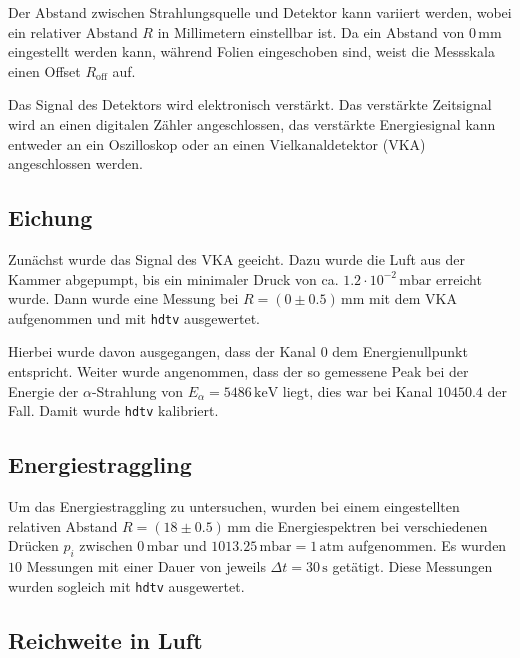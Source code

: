 \documentclass[12pt,a4paper]{scrartcl}
\numberwithin{equation}{section} %
\begin{document}
Der Abstand zwischen Strahlungsquelle und Detektor kann variiert werden, wobei ein relativer Abstand $R$ in Millimetern einstellbar ist. Da ein Abstand von $0\mathrm{\,mm}$ eingestellt werden kann, während Folien eingeschoben sind, weist die Messskala einen Offset $R_\mathrm{off}$ auf.

Das Signal des Detektors wird elektronisch verstärkt. Das verstärkte Zeitsignal wird an einen digitalen Zähler angeschlossen, das verstärkte Energiesignal kann entweder an ein Oszilloskop oder an einen Vielkanaldetektor (VKA) angeschlossen werden.

\hypertarget{eichung}{%
\subsection{Eichung}\label{eichung}}

Zunächst wurde das Signal des VKA geeicht. Dazu wurde die Luft aus der Kammer abgepumpt, bis ein minimaler Druck von ca. $1.2\cdot10^{-2}\mathrm{\,mbar}$ erreicht wurde. Dann wurde eine Messung bei $R=(0\pm0.5)\mathrm{\,mm}$ mit dem VKA aufgenommen und mit \texttt{hdtv} \cite{hdtv} ausgewertet.

Hierbei wurde davon ausgegangen, dass der Kanal $0$ dem Energienullpunkt entspricht. Weiter wurde angenommen, dass der so gemessene Peak bei der Energie der $\alpha$-Strahlung von $E_\alpha = 5486\mathrm{\,keV}$ liegt, dies war bei Kanal $10450.4$ der Fall. Damit wurde \texttt{hdtv} kalibriert.

\hypertarget{energiestraggling}{%
\subsection{Energiestraggling}\label{energiestraggling}}

Um das Energiestraggling zu untersuchen, wurden bei einem eingestellten relativen Abstand $R=(18\pm 0.5)\mathrm{\,mm}$ die Energiespektren bei verschiedenen Drücken $p_i$ zwischen $0\mathrm{\,mbar}$ und $1013.25\mathrm{\,mbar}=1\mathrm{\,atm}$ aufgenommen. Es wurden $10$ Messungen mit einer Dauer von jeweils $\Delta t=30\mathrm{\,s}$ getätigt. Diese Messungen wurden sogleich mit \texttt{hdtv} \cite{hdtv} ausgewertet.

\hypertarget{reichweite-in-luft}{%
\subsection{Reichweite in Luft}\label{reichweite-in-luft}}
\end{document}
